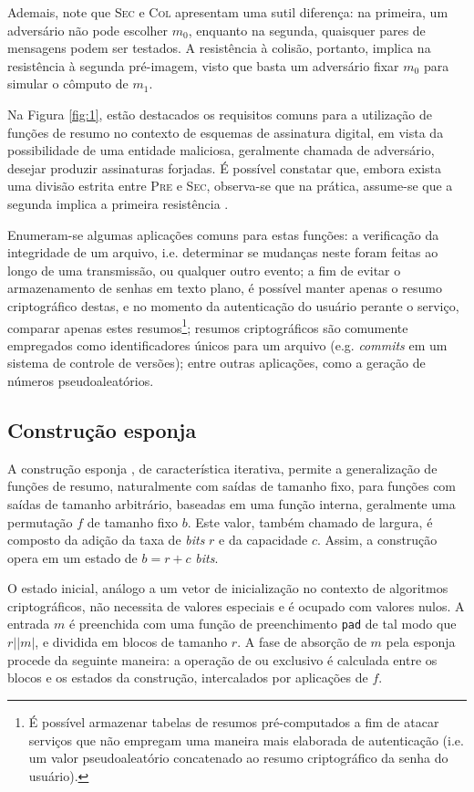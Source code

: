 \documentclass[12pt,notitlepage]{report}
\newcommand{\length}[1]{\vert #1 \vert}
\begin{document}
Ademais, note que \textsc{Sec} e \textsc{Col} apresentam uma sutil diferença:
na primeira, um adversário não pode escolher $m_0$, enquanto na segunda,
quaisquer pares de mensagens podem ser testados. A resistência à colisão,
portanto, implica na resistência à segunda pré-imagem, visto que basta um
adversário fixar $m_0$ para simular o cômputo de $m_1$.

Na Figura \ref{fig:1}, estão destacados os requisitos comuns para a utilização
de funções de resumo no contexto de esquemas de assinatura digital, em vista da
possibilidade de uma entidade maliciosa, geralmente chamada de adversário,
desejar produzir assinaturas forjadas. É possível constatar que, embora exista
uma divisão estrita entre \textsc{Pre} e \textsc{Sec}, observa-se que na
prática, assume-se que a segunda implica a primeira resistência
\cite[9.20]{Menezes:1996:HAC:548089}.

Enumeram-se algumas aplicações comuns para estas funções: a verificação da
integridade de um arquivo, i.e. determinar se mudanças neste foram feitas ao
longo de uma transmissão, ou qualquer outro evento; a fim de evitar o
armazenamento de senhas em texto plano, é possível manter apenas o resumo
criptográfico destas, e no momento da autenticação do usuário perante o
serviço, comparar apenas estes resumos\footnote{É possível armazenar tabelas de
resumos pré-computados a fim de atacar serviços que não empregam uma maneira
mais elaborada de autenticação (i.e. um valor pseudoaleatório concatenado ao
resumo criptográfico da senha do usuário).}; resumos criptográficos são
comumente empregados como identificadores únicos para um arquivo (e.g.
\emph{commits} em um sistema de controle de versões); entre outras aplicações,
como a geração de números pseudoaleatórios.

\subsection{Construção esponja}

A construção esponja \cite{SpongeReference}, de característica iterativa,
permite a generalização de funções de resumo, naturalmente com saídas de
tamanho fixo, para funções com saídas de tamanho arbitrário, baseadas em uma
função interna, geralmente uma permutação $f$ de tamanho fixo $b$. Este valor,
também chamado de largura, é composto da adição da taxa de \emph{bits} $r$ e da
capacidade $c$. Assim, a construção opera em um estado de $b = r + c$
\emph{bits}.

O estado inicial, análogo a um vetor de inicialização no contexto de algoritmos
criptográficos, não necessita de valores especiais e é ocupado com valores
nulos. A entrada $m$ é preenchida com uma função de preenchimento \texttt{pad}
de tal modo que $r \mid \length{m}$, e dividida em blocos de tamanho $r$. A
fase de absorção de $m$ pela esponja procede da seguinte maneira: a operação de
ou exclusivo é calculada entre os blocos e os estados da construção,
intercalados por aplicações de $f$.
\end{document}
